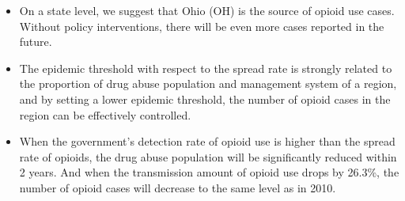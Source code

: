 \begin{itemize}
	\item On a state level, we suggest that Ohio (OH) is the source of opioid use cases. Without policy interventions, there will be even more cases reported in the future.
	\item The epidemic threshold with respect to the spread rate is strongly related to the proportion of drug abuse population and management system of a region, and by setting a lower epidemic threshold, the number of opioid cases in the region can be effectively controlled.
	\item When the government's detection rate of opioid use is higher than the spread rate of opioids, the drug abuse population will be significantly reduced within 2 years. And when the transmission amount of opioid use drops by 26.3\%, the number of opioid cases will decrease to the same level as in 2010.
\end{itemize}

